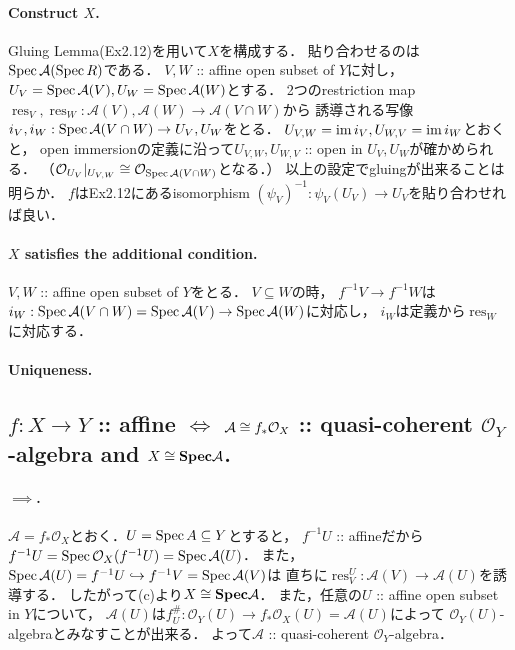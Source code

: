 \documentclass[a4paper]{jsarticle}
\newcommand{\shA}{\mathcal{A}}
\newcommand{\shO}{\mathcal{O}}
\newcommand{\res}{\operatorname{res}}
\newcommand{\bfSpec}{\mathbf{Spec}}
\begin{document}
    \paragraph{Construct $X$.}
    Gluing Lemma(Ex2.12)を用いて$X$を構成する．
    貼り合わせるのは$\Spec \shA(\Spec R)$である．
    $V, W$ :: affine open subset of $Y$に対し，
    $U_{V}=\Spec \shA(V), U_{W}=\Spec \shA(W)$とする．
    2つのrestriction map $\res_V, \res_W: \shA(V), \shA(W) \to \shA(V \cap W)$から
    誘導される写像$i_V, i_W: \Spec \shA(V \cap W) \to U_V, U_W$をとる．
    $U_{V,W}=\operatorname{im} i_V, U_{W,V}=\operatorname{im} i_W$とおくと，
    open immersionの定義に沿って$U_{V,W}, U_{W,V}$ :: open in $U_V, U_W$が確かめられる．
    （$\shO_{U_V}|_{U_{V,W}} \iso \shO_{\Spec \shA(V \cap W)}$となる．）
    以上の設定でgluingが出来ることは明らか．
    $f$はEx2.12にあるisomorphism $(\psi_V)^{-1}: \psi_V(U_V) \to U_V$を貼り合わせれば良い．

    \paragraph{$X$ satisfies the additional condition.}
    $V, W$ :: affine open subset of $Y$をとる．
    $V \subseteq W$の時，
    $f^{-1}V \to f^{-1}W$は$i_W: \Spec \shA(V \cap W)=\Spec \shA(V) \to \Spec \shA(W)$に対応し，
    $i_W$は定義から$\res_W$に対応する．

    \paragraph{Uniqueness.}

    \subsection{$f: X \to Y$ :: affine $\iff$
        $\shA \iso f_* \shO_X$ :: quasi-coherent $\shO_Y$-algebra and $X \iso \bfSpec \shA$.}

    \paragraph{$\implies$.}
    $\shA=f_* \shO_X$とおく．$U=\operatorname{Spec} A \subseteq Y$とすると，
    $f^{-1}U$ :: affineだから$f^{-1}U=\Spec \shO_X(f^{-1}U)=\Spec \shA(U)$．
    また，$\Spec \shA(U)=f^{-1}U \hookrightarrow f^{-1}V=\Spec \shA(V)$は
    直ちに$\res_V^U: \shA(V) \to \shA(U)$を誘導する．
    したがって(c)より$X \iso \bfSpec \shA$．
    また，任意の$U$ :: affine open subset in $Y$について，
    $\shA(U)$は$f^{\#}_U: \shO_Y(U) \to f_*\shO_X(U)=\shA(U)$によって
    $\shO_Y(U)$-algebraとみなすことが出来る．
    よって$\shA$ :: quasi-coherent $\shO_Y$-algebra．
\end{document}
